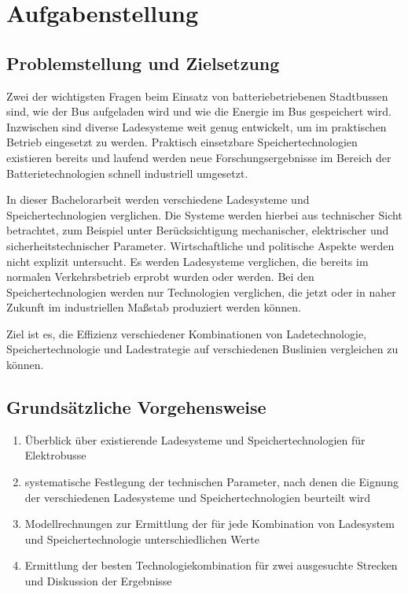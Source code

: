 \chapter*{Aufgabenstellung}

\section*{Problemstellung und Zielsetzung}
Zwei der wichtigsten Fragen beim Einsatz von batteriebetriebenen Stadtbussen sind, wie der Bus aufgeladen wird und wie die Energie im Bus gespeichert wird. Inzwischen sind diverse Ladesysteme weit genug entwickelt, um im praktischen Betrieb eingesetzt zu werden. Praktisch einsetzbare Speichertechnologien existieren bereits und laufend werden neue Forschungsergebnisse im Bereich der Batterietechnologien schnell industriell umgesetzt.

In dieser Bachelorarbeit werden verschiedene Ladesysteme und Speichertechnologien verglichen. Die Systeme werden hierbei aus technischer Sicht betrachtet, zum Beispiel unter Berücksichtigung mechanischer, elektrischer und sicherheitstechnischer Parameter. Wirtschaftliche und politische Aspekte werden nicht explizit untersucht. Es werden Ladesysteme verglichen, die bereits im normalen Verkehrsbetrieb erprobt wurden oder werden. Bei den Speichertechnologien werden nur Technologien verglichen, die jetzt oder in naher Zukunft im industriellen Maßstab produziert werden können.

Ziel ist es, die Effizienz verschiedener Kombinationen von Ladetechnologie, Speichertechnologie und Ladestrategie auf verschiedenen Buslinien vergleichen zu können.

\section*{Grundsätzliche Vorgehensweise}
\begin{enumerate}
	\item Überblick über existierende Ladesysteme und Speichertechnologien für Elektrobusse
	\item systematische Festlegung der technischen Parameter, nach denen die Eignung der verschiedenen Ladesysteme und Speichertechnologien beurteilt wird
	\item Modellrechnungen zur Ermittlung der für jede Kombination von Ladesystem und Speichertechnologie unterschiedlichen Werte
	\item Ermittlung der besten Technologiekombination für zwei ausgesuchte Strecken und Diskussion der Ergebnisse
\end{enumerate}